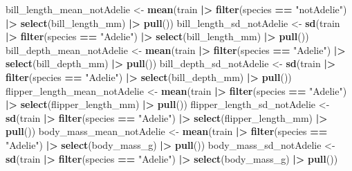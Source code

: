 \documentclass[
]{article}
\newenvironment{Shaded}{\begin{snugshade}}{\end{snugshade}}
\newcommand{\FunctionTok}[1]{\textcolor[rgb]{0.13,0.29,0.53}{\textbf{#1}}}
\newcommand{\NormalTok}[1]{#1}
\newcommand{\OtherTok}[1]{\textcolor[rgb]{0.56,0.35,0.01}{#1}}
\newcommand{\SpecialCharTok}[1]{\textcolor[rgb]{0.81,0.36,0.00}{\textbf{#1}}}
\newcommand{\StringTok}[1]{\textcolor[rgb]{0.31,0.60,0.02}{#1}}
\begin{document}
\begin{Shaded}
\begin{Highlighting}[]
\NormalTok{bill\_length\_mean\_notAdelie }\OtherTok{\textless{}{-}} \FunctionTok{mean}\NormalTok{(train }\SpecialCharTok{|\textgreater{}} \FunctionTok{filter}\NormalTok{(species }\SpecialCharTok{==} \StringTok{"notAdelie"}\NormalTok{) }\SpecialCharTok{|\textgreater{}} \FunctionTok{select}\NormalTok{(bill\_length\_mm) }\SpecialCharTok{|\textgreater{}} \FunctionTok{pull}\NormalTok{())}
\NormalTok{bill\_length\_sd\_notAdelie }\OtherTok{\textless{}{-}} \FunctionTok{sd}\NormalTok{(train }\SpecialCharTok{|\textgreater{}} \FunctionTok{filter}\NormalTok{(species }\SpecialCharTok{==} \StringTok{"Adelie"}\NormalTok{) }\SpecialCharTok{|\textgreater{}} \FunctionTok{select}\NormalTok{(bill\_length\_mm) }\SpecialCharTok{|\textgreater{}} \FunctionTok{pull}\NormalTok{())}
\NormalTok{bill\_depth\_mean\_notAdelie }\OtherTok{\textless{}{-}} \FunctionTok{mean}\NormalTok{(train }\SpecialCharTok{|\textgreater{}} \FunctionTok{filter}\NormalTok{(species }\SpecialCharTok{==} \StringTok{"Adelie"}\NormalTok{) }\SpecialCharTok{|\textgreater{}} \FunctionTok{select}\NormalTok{(bill\_depth\_mm) }\SpecialCharTok{|\textgreater{}} \FunctionTok{pull}\NormalTok{())}
\NormalTok{bill\_depth\_sd\_notAdelie }\OtherTok{\textless{}{-}} \FunctionTok{sd}\NormalTok{(train }\SpecialCharTok{|\textgreater{}} \FunctionTok{filter}\NormalTok{(species }\SpecialCharTok{==} \StringTok{"Adelie"}\NormalTok{) }\SpecialCharTok{|\textgreater{}} \FunctionTok{select}\NormalTok{(bill\_depth\_mm) }\SpecialCharTok{|\textgreater{}} \FunctionTok{pull}\NormalTok{())}
\NormalTok{flipper\_length\_mean\_notAdelie }\OtherTok{\textless{}{-}} \FunctionTok{mean}\NormalTok{(train }\SpecialCharTok{|\textgreater{}} \FunctionTok{filter}\NormalTok{(species }\SpecialCharTok{==} \StringTok{"Adelie"}\NormalTok{) }\SpecialCharTok{|\textgreater{}} \FunctionTok{select}\NormalTok{(flipper\_length\_mm) }\SpecialCharTok{|\textgreater{}} \FunctionTok{pull}\NormalTok{())}
\NormalTok{flipper\_length\_sd\_notAdelie }\OtherTok{\textless{}{-}} \FunctionTok{sd}\NormalTok{(train }\SpecialCharTok{|\textgreater{}} \FunctionTok{filter}\NormalTok{(species }\SpecialCharTok{==} \StringTok{"Adelie"}\NormalTok{) }\SpecialCharTok{|\textgreater{}} \FunctionTok{select}\NormalTok{(flipper\_length\_mm) }\SpecialCharTok{|\textgreater{}} \FunctionTok{pull}\NormalTok{())}
\NormalTok{body\_mass\_mean\_notAdelie }\OtherTok{\textless{}{-}} \FunctionTok{mean}\NormalTok{(train }\SpecialCharTok{|\textgreater{}} \FunctionTok{filter}\NormalTok{(species }\SpecialCharTok{==} \StringTok{"Adelie"}\NormalTok{) }\SpecialCharTok{|\textgreater{}} \FunctionTok{select}\NormalTok{(body\_mass\_g) }\SpecialCharTok{|\textgreater{}} \FunctionTok{pull}\NormalTok{())}
\NormalTok{body\_mass\_sd\_notAdelie }\OtherTok{\textless{}{-}} \FunctionTok{sd}\NormalTok{(train }\SpecialCharTok{|\textgreater{}} \FunctionTok{filter}\NormalTok{(species }\SpecialCharTok{==} \StringTok{"Adelie"}\NormalTok{) }\SpecialCharTok{|\textgreater{}} \FunctionTok{select}\NormalTok{(body\_mass\_g) }\SpecialCharTok{|\textgreater{}} \FunctionTok{pull}\NormalTok{())}
\end{Highlighting}
\end{Shaded}
\end{document}

